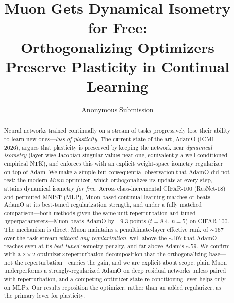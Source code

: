 \documentclass[letterpaper,twocolumn,10pt]{article}
\title{\textbf{Muon Gets Dynamical Isometry for Free:\\ Orthogonalizing Optimizers Preserve Plasticity in Continual Learning}}
\author{Anonymous Submission}
\date{}
\begin{document}
\maketitle

\begin{abstract}
Neural networks trained continually on a stream of tasks progressively lose their ability to learn new ones---\emph{loss of plasticity}. The current state of the art, AdamO (ICML 2026), argues that plasticity is preserved by keeping the network near \emph{dynamical isometry} (layer-wise Jacobian singular values near one, equivalently a well-conditioned empirical NTK), and enforces this with an explicit weight-space isometry regularizer on top of Adam. We make a simple but consequential observation that AdamO did not test: the modern \emph{Muon} optimizer, which orthogonalizes its update at every step, attains dynamical isometry \emph{for free}. Across class-incremental CIFAR-100 (ResNet-18) and permuted-MNIST (MLP), Muon-based continual learning matches or beats AdamO at its best-tuned regularization strength, and under a fully matched comparison---both methods given the same unit-reperturbation and tuned hyperparameters---Muon beats AdamO by $+9.3$ points ($t{=}8.4$, $n{=}5$) on CIFAR-100. The mechanism is direct: Muon maintains a penultimate-layer effective rank of ${\sim}167$ over the task stream \emph{without any regularization}, well above the ${\sim}107$ that AdamO reaches even at its \emph{best-tuned} isometry penalty, and far above Adam's ${\sim}59$. We confirm with a $2{\times}2$ optimizer$\times$reperturbation decomposition that the orthogonalizing base---not the reperturbation---carries the gain, and we are explicit about scope: plain Muon underperforms a strongly-regularized AdamO on deep residual networks unless paired with reperturbation, and a competing optimizer-state re-conditioning lever helps only on MLPs. Our results reposition the optimizer, rather than an added regularizer, as the primary lever for plasticity.
\end{abstract}
\end{document}
